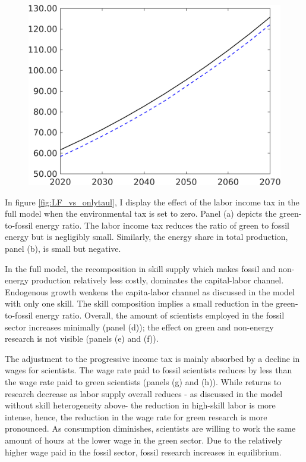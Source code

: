 \begin{figure}[h!!]
\begin{minipage}[]{0.32\textwidth}
	\end{minipage}
	\begin{minipage}[]{0.32\textwidth}
		\includegraphics[width=1\textwidth]{../../codding_model/own_basedOnFried/optimalPol_190722_tidiedUp/figures/all_10Aout22/CountTaul_modnsk_target_Emnet_spillover0_sep1_extern0_PV1_etaa0.79_lgd0.png}
	\end{minipage}
\end{figure}


In figure \ref{fig:LF_vs_onlytaul}, I display the effect of the labor income tax in the full model when the environmental tax is set to zero.  Panel (a) depicts the green-to-fossil energy ratio. The labor income tax reduces the ratio of green to fossil energy but is negligibly small. Similarly, the energy share in total production, panel (b), is small but negative.
  
In the full model, the recomposition in skill supply which makes fossil and non-energy production relatively less costly, dominates the capital-labor channel. 
Endogenous growth weakens the capita-labor channel as discussed in the model with only one skill. The skill composition implies a small reduction in the green-to-fossil energy ratio.
Overall, the amount of scientists employed in the fossil sector increases minimally (panel (d)); the effect on green and non-energy research is not visible (panels (e) and (f)). 
	
	
The adjustment to the progressive income tax is mainly absorbed by a decline in wages for scientists. The wage rate paid to fossil scientists reduces by less than the wage rate paid to green scientists (panels (g) and (h)). While returns to research decrease as labor supply overall reduces - as discussed in the model without skill heterogeneity above- the reduction in high-skill labor is more intense, hence, the reduction in the wage rate for green research is more pronounced.
As consumption diminishes, scientists are willing to work the same amount of hours at the lower wage in the green sector. Due to the relatively higher wage paid in the fossil sector, fossil research increases in equilibrium. 

